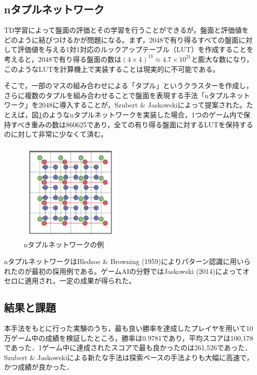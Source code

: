 \documentclass{suribt}
\begin{document}
\subsection{nタプルネットワーク}
TD学習によって盤面の評価とその学習を行うことができるが，盤面と評価値をどのように結びつけるかが問題になる。まず，2048で有り得るすべての盤面に対して評価値を与える1対1対応のルックアップテーブル（LUT）を作成することを考えると，2048で有り得る盤面の数は$(4 \times 4)^{18} \approx 4.7 \times 10^{21}$と膨大な数になり，このようなLUTを計算機上で実装することは現実的に不可能である。

そこで，一部のマスの組み合わせによる「タプル」というクラスターを作成し，さらに複数のタプルを組み合わせることで盤面を表現する手法「nタプルネットワーク」を2048に導入することが，Szubert \& Jaskowskiによって提案された。たとえば，図\ref{figure_001}のようなnタプルネットワークを実装した場合，1つのゲーム内で保持すべき重みの数は860625であり，全ての有り得る盤面に対するLUTを保持するのに対して非常に少なくて済む。

\begin{figure}[t]
	\begin{center}
	\includegraphics[width=5cm]{figure_001.png}
	\caption{nタプルネットワークの例}
	\label{figure_001}
	\end{center}
\end{figure}

nタプルネットワークはBledsoe \& Browning (1959)によりパターン認識に用いられたのが最初の採用例である。ゲームAIの分野ではJaskowski (2014)によってオセロに適用され，一定の成果が得られた。

\subsection{結果と課題}
本手法をもとに行った実験のうち，最も良い勝率を達成したプレイヤを用いて10万ゲーム中の成績を検証したところ，勝率は0.9781であり，平均スコアは100,178であった．1ゲーム中に達成されたスコアで最も良かったのは261,526であった．Szubert \& Jaskowskiによる新たな手法は探索ベースの手法よりも大幅に高速で，かつ成績が良かった．
\end{document}
